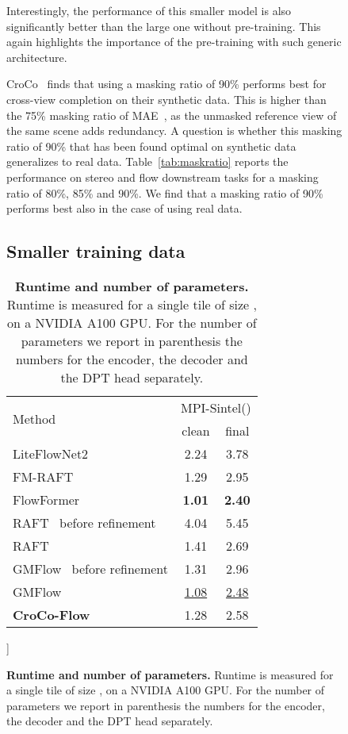 \documentclass[10pt,twocolumn,letterpaper]{article}
\newcommand{\vpara}[1]{\vspace{1mm} \noindent{\bf{#1}}}
\newcommand{\ul}[1]{\underline{#1}}
\newcommand{\oursflow}{CroCo-Flow\xspace}
\begin{document}
\begin{figure}
{\begin{center}
Interestingly, the performance of this smaller model is also significantly better than the large one without pre-training. This again highlights the importance of the pre-training with such generic architecture.

\vpara{Masking ratio.} CroCo~\cite{croco} finds that using a masking ratio of 90\% performs best for cross-view completion on their synthetic data. This is higher than the 75\% masking ratio of MAE~\cite{mae}, as the unmasked reference view of the same scene adds redundancy. 
A question is whether this masking ratio of 90\% that has been found optimal on synthetic data generalizes to real data.
Table~\ref{tab:maskratio} reports the performance on stereo and flow downstream tasks for a masking ratio of 80\%, 85\% and 90\%.
We find that a masking ratio of 90\% performs best also in the case of using real data.

\subsection{Smaller training data}

\begin{table}
\centering
\begin{tabular}{lcc}
\toprule
 \multirow{2}{*}{Method} & \multicolumn{2}{c}{MPI-Sintel()} \\
 & clean & final \\
\cmidrule(lr){1-1} \cmidrule{2-3}
LiteFlowNet2~\cite{liteflownet2} & 2.24 & 3.78 \\
FM-RAFT~\cite{fmraft} & 1.29 & 2.95 \\
FlowFormer~\cite{flowformer} & \bf{1.01} & \bf{2.40} \\ 
RAFT~\cite{raft} before refinement        & 4.04 & 5.45 \\
RAFT~\cite{raft} & 1.41 & 2.69 \\ 
GMFlow~\cite{unimatch} before refinement  & 1.31 & 2.96 \\
GMFlow~\cite{unimatch} & \ul{1.08} & \ul{2.48} \\
\textbf{\oursflow} & 1.28 & 2.58 \\
\bottomrule
\end{tabular} \-0.3cm]
\caption{\textbf{Runtime and number of parameters.} Runtime is measured for a single tile of size , on a NVIDIA A100 GPU. For the number of parameters we report in parenthesis the numbers for the encoder, the decoder and the DPT head separately.}
\label{tab:runtime}
\end{table}




\end{center}}
\end{figure}
\end{document}
